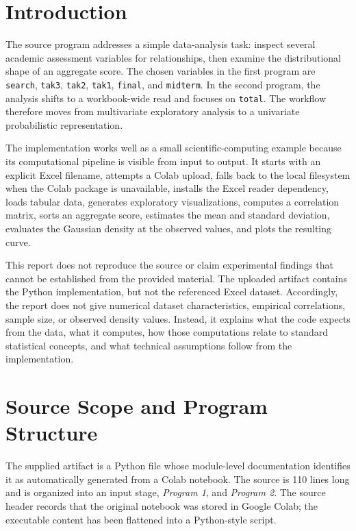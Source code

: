 \documentclass[11pt,a4paper]{article}
\begin{document}
\section{Introduction}
The source program addresses a simple data-analysis task: inspect several academic assessment variables for relationships, then examine the distributional shape of an aggregate score. The chosen variables in the first program are \texttt{search}, \texttt{tak3}, \texttt{tak2}, \texttt{tak1}, \texttt{final}, and \texttt{midterm}. In the second program, the analysis shifts to a workbook-wide read and focuses on \texttt{total}. The workflow therefore moves from multivariate exploratory analysis to a univariate probabilistic representation.

The implementation works well as a small scientific-computing example because its computational pipeline is visible from input to output. It starts with an explicit Excel filename, attempts a Colab upload, falls back to the local filesystem when the Colab package is unavailable, installs the Excel reader dependency, loads tabular data, generates exploratory visualizations, computes a correlation matrix, sorts an aggregate score, estimates the mean and standard deviation, evaluates the Gaussian density at the observed values, and plots the resulting curve.

This report does not reproduce the source or claim experimental findings that cannot be established from the provided material. The uploaded artifact contains the Python implementation, but not the referenced Excel dataset. Accordingly, the report does not give numerical dataset characteristics, empirical correlations, sample size, or observed density values. Instead, it explains what the code expects from the data, what it computes, how those computations relate to standard statistical concepts, and what technical assumptions follow from the implementation.

\section{Source Scope and Program Structure}
The supplied artifact is a Python file whose module-level documentation identifies it as automatically generated from a Colab notebook. The source is 110 lines long and is organized into an input stage, \emph{Program 1}, and \emph{Program 2}. The source header records that the original notebook was stored in Google Colab; the executable content has been flattened into a Python-style script.
\end{document}
